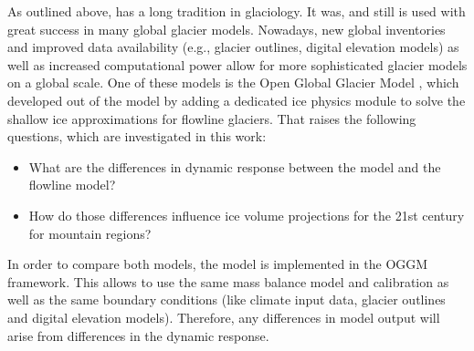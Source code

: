     As outlined above, \vas{} has a long tradition in glaciology. It was, and still is used with great success in many global glacier models. Nowadays, new global inventories and improved data availability (e.g., glacier outlines, digital elevation models) as well as increased computational power allow for more sophisticated glacier models on a global scale. One of these models is the Open Global Glacier Model \citep[OGGM,][]{Maussion2019}, which developed out of the \vas{} model \citep{Marzeion2012b} by adding a dedicated ice physics module to solve the shallow ice approximations for flowline glaciers. That raises the following questions, which are investigated in this work:
    \begin{itemize}
        \item What are the differences in dynamic response between the \vas{} model and the flowline model?
        \item How do those differences influence ice volume projections for the 21st century for mountain regions?
    \end{itemize}
    In order to compare both models, the \vas{} model is implemented in the OGGM framework. This allows to use the same mass balance model and calibration as well as the same boundary conditions (like climate input data, glacier outlines and digital elevation models). Therefore, any differences in model output will arise from differences in the dynamic response.
    
    
